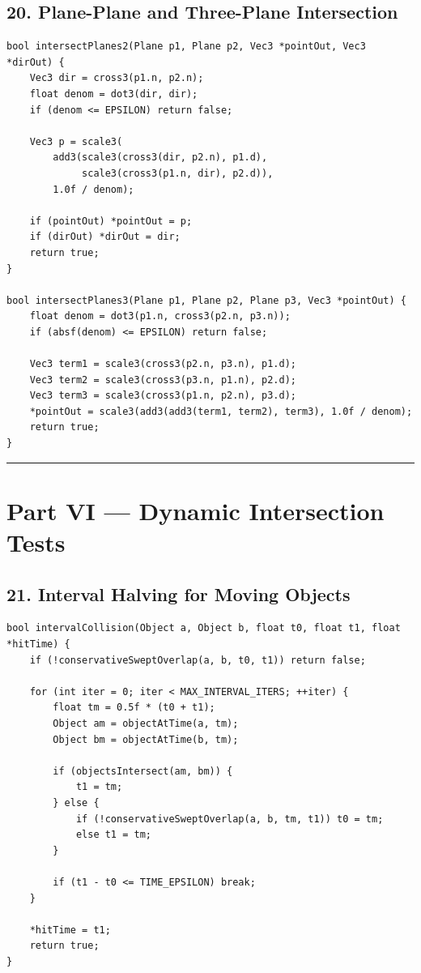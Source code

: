 \documentclass[10pt,letterpaper]{article}
\begin{document}
\subsection*{20. Plane-Plane and Three-Plane Intersection}

\begin{verbatim}
bool intersectPlanes2(Plane p1, Plane p2, Vec3 *pointOut, Vec3 *dirOut) {
    Vec3 dir = cross3(p1.n, p2.n);
    float denom = dot3(dir, dir);
    if (denom <= EPSILON) return false;

    Vec3 p = scale3(
        add3(scale3(cross3(dir, p2.n), p1.d),
             scale3(cross3(p1.n, dir), p2.d)),
        1.0f / denom);

    if (pointOut) *pointOut = p;
    if (dirOut) *dirOut = dir;
    return true;
}

bool intersectPlanes3(Plane p1, Plane p2, Plane p3, Vec3 *pointOut) {
    float denom = dot3(p1.n, cross3(p2.n, p3.n));
    if (absf(denom) <= EPSILON) return false;

    Vec3 term1 = scale3(cross3(p2.n, p3.n), p1.d);
    Vec3 term2 = scale3(cross3(p3.n, p1.n), p2.d);
    Vec3 term3 = scale3(cross3(p1.n, p2.n), p3.d);
    *pointOut = scale3(add3(add3(term1, term2), term3), 1.0f / denom);
    return true;
}
\end{verbatim}

\medskip\hrule\medskip


\clearpage
{}
\section*{Part VI --- Dynamic Intersection Tests}


\subsection*{21. Interval Halving for Moving Objects}

\begin{verbatim}
bool intervalCollision(Object a, Object b, float t0, float t1, float *hitTime) {
    if (!conservativeSweptOverlap(a, b, t0, t1)) return false;

    for (int iter = 0; iter < MAX_INTERVAL_ITERS; ++iter) {
        float tm = 0.5f * (t0 + t1);
        Object am = objectAtTime(a, tm);
        Object bm = objectAtTime(b, tm);

        if (objectsIntersect(am, bm)) {
            t1 = tm;
        } else {
            if (!conservativeSweptOverlap(a, b, tm, t1)) t0 = tm;
            else t1 = tm;
        }

        if (t1 - t0 <= TIME_EPSILON) break;
    }

    *hitTime = t1;
    return true;
}
\end{verbatim}
\end{document}
